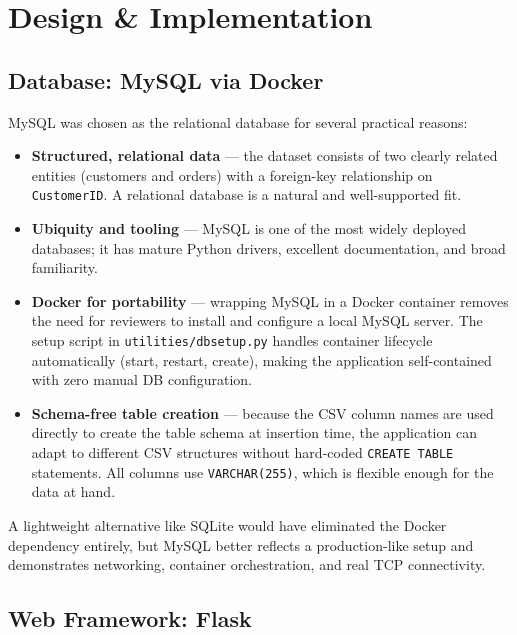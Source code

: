 \documentclass[12pt,a4paper]{article}
\begin{document}
\section{Design \& Implementation}

\subsection{Database: MySQL via Docker}

MySQL was chosen as the relational database for several practical reasons:

\begin{itemize}[leftmargin=2em]
    \item \textbf{Structured, relational data} --- the dataset consists of two
          clearly related entities (customers and orders) with a foreign-key
          relationship on \texttt{CustomerID}. A relational database is a
          natural and well-supported fit.
    \item \textbf{Ubiquity and tooling} --- MySQL is one of the most widely
          deployed databases; it has mature Python drivers, excellent
          documentation, and broad familiarity.
    \item \textbf{Docker for portability} --- wrapping MySQL in a Docker
          container removes the need for reviewers to install and configure a
          local MySQL server. The setup script in \texttt{utilities/dbsetup.py}
          handles container lifecycle automatically (start, restart, create),
          making the application self-contained with zero manual DB
          configuration.
    \item \textbf{Schema-free table creation} --- because the CSV column
          names are used directly to create the table schema at insertion time,
          the application can adapt to different CSV structures without
          hard-coded \texttt{CREATE TABLE} statements. All columns use
          \texttt{VARCHAR(255)}, which is flexible enough for the data at hand.
\end{itemize}

A lightweight alternative like SQLite would have eliminated the Docker
dependency entirely, but MySQL better reflects a production-like setup and
demonstrates networking, container orchestration, and real TCP connectivity.

\subsection{Web Framework: Flask}
\end{document}
